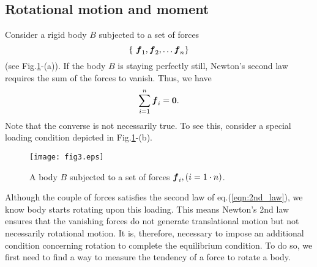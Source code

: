 \documentclass[10pt,a4j]{article}
\begin{document}
\subsection{Rotational motion and moment}
Consider a rigid body $B$ subjected to a set of forces
\[ 
	\left\{\ \fat{f}_1, \fat{f}_2, \dots \fat{f}_{n} \right\}
\]
(see Fig.\ref{fig:fig3}-(a)).
If the body $B$ is staying perfectly still, Newton's second law requires the sum of the 
forces to vanish. Thus, we have
\begin{equation}
	\sum_{i=1}^n \mbox{\boldmath $f$}_i = \mbox{\boldmath $0$}.
	\label{eqn:2nd_law}
\end{equation}
Note that the converse is not necessarily true. To see this, consider a special loading 
condition depicted in Fig.\ref{fig:fig3}-(b). 
\begin{figure}[h]
	\begin{center}
	\texttt{[image: fig3.eps]} 
	\end{center}
	\caption{A body $B$ subjected to a set of forces $\mbox{\boldmath $f$}_i,(i=1\cdot n)$.} 
	\label{fig:fig3}
\end{figure}
Although the couple of forces satisfies the second law of eq.(\ref{eqn:2nd_law}), 
we know body starts rotating upon this loading. This means Newton's 2nd law ensures 
that the vanishing forces do not generate translational 
motion but not necessarily rotational motion. It is, therefore, necessary to impose 
an additional condition concerning rotation to complete the equilibrium condition. 
To do so, we first need to find a way to measure the tendency of a force to rotate a body.
\end{document}
